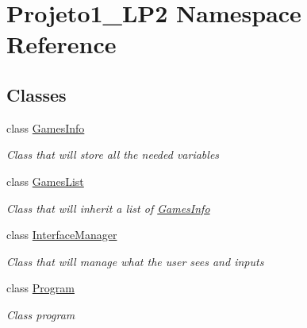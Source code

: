 \hypertarget{namespace_projeto1___l_p2}{}\section{Projeto1\+\_\+\+L\+P2 Namespace Reference}
\label{namespace_projeto1___l_p2}
\subsection*{Classes}
\begin{DoxyCompactItemize}
\item 
class \hyperlink{class_projeto1___l_p2_1_1_games_info}{Games\+Info}
\begin{DoxyCompactList}\small\item\em Class that will store all the needed variables \end{DoxyCompactList}\item 
class \hyperlink{class_projeto1___l_p2_1_1_games_list}{Games\+List}
\begin{DoxyCompactList}\small\item\em Class that will inherit a list of \hyperlink{class_projeto1___l_p2_1_1_games_info}{Games\+Info} \end{DoxyCompactList}\item 
class \hyperlink{class_projeto1___l_p2_1_1_interface_manager}{Interface\+Manager}
\begin{DoxyCompactList}\small\item\em Class that will manage what the user sees and inputs \end{DoxyCompactList}\item 
class \hyperlink{class_projeto1___l_p2_1_1_program}{Program}
\begin{DoxyCompactList}\small\item\em Class program \end{DoxyCompactList}\end{DoxyCompactItemize}
